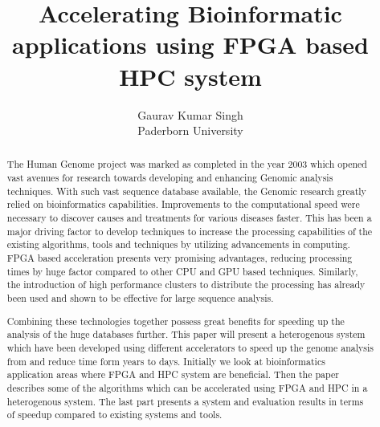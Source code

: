 \documentclass[12pt,twoside]{article}
\newcommand{\participant}{Gaurav Kumar Singh}
\newcommand{\affiliation}{Paderborn University}
\newcommand{\topic}{Accelerating Bioinformatic applications using FPGA based HPC system}
\begin{document}
\title{\topic}
\author{\Large{\participant}\\ \affiliation \\ {\small \emailaddress}}
\date{}
\maketitle
\thispagestyle{empty}


\begin{abstract}

 The Human Genome project was marked as completed in the year 2003 which opened vast avenues 
 for research towards developing and enhancing Genomic analysis techniques. With such vast sequence
 database available, the Genomic research greatly relied on bioinformatics capabilities. Improvements
 to the computational speed were necessary to discover causes and treatments for various
 diseases faster. This has been a major driving factor to develop techniques to increase the processing
 capabilities of the existing algorithms, tools and techniques by utilizing advancements in computing.
 FPGA based acceleration presents very promising advantages, reducing processing times
 by huge factor compared to other CPU and GPU based techniques. Similarly, the introduction of high performance
 clusters to distribute the processing has already been used and shown to be effective for large sequence analysis.

 Combining these technologies together possess great benefits for speeding up the analysis of the huge databases further.
 This paper will present a heterogenous system which have been developed using different accelerators to
 speed up the genome analysis from and reduce time form years to days. Initially we look at bioinformatics application
 areas where  FPGA and HPC system are beneficial. Then the paper describes some of the algorithms which can be accelerated
 using FPGA and HPC in a heterogenous system. The last part presents a system and evaluation
 results in terms of speedup compared to existing systems and tools.

\end{abstract}

\end{document}
